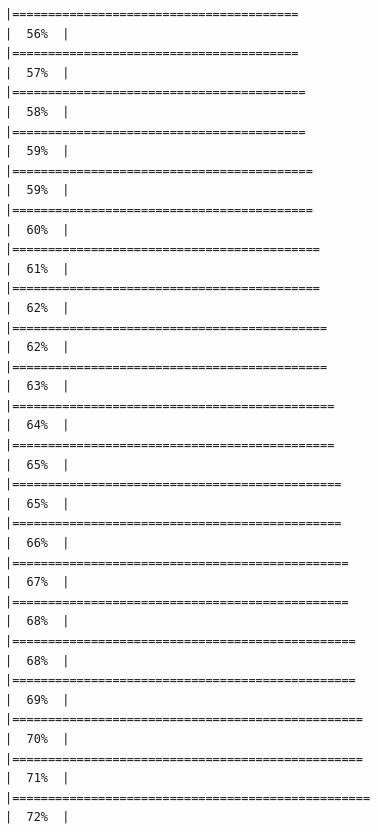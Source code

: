 \documentclass[
]{article}
\begin{document}
\begin{verbatim}
|========================================                              |  56%  |                                                                              |========================================                              |  57%  |                                                                              |=========================================                             |  58%  |                                                                              |=========================================                             |  59%  |                                                                              |==========================================                            |  59%  |                                                                              |==========================================                            |  60%  |                                                                              |===========================================                           |  61%  |                                                                              |===========================================                           |  62%  |                                                                              |============================================                          |  62%  |                                                                              |============================================                          |  63%  |                                                                              |=============================================                         |  64%  |                                                                              |=============================================                         |  65%  |                                                                              |==============================================                        |  65%  |                                                                              |==============================================                        |  66%  |                                                                              |===============================================                       |  67%  |                                                                              |===============================================                       |  68%  |                                                                              |================================================                      |  68%  |                                                                              |================================================                      |  69%  |                                                                              |=================================================                     |  70%  |                                                                              |=================================================                     |  71%  |                                                                              |==================================================                    |  72%  |                                                                              
\end{verbatim}
\end{document}
